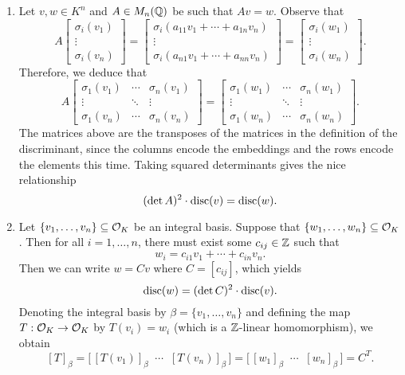 \begin{enumerate}[(1)]
    \item Let $v, w \in K^n$ and $A \in M_n(\mathbb{Q})$ be such that $Av = w$. 
    Observe that 
    \[ A \begin{bmatrix} \sigma_i(v_1) \\ \vdots \\ \sigma_i(v_n) \end{bmatrix} 
    = \begin{bmatrix} \sigma_i(a_{11}v_1 + \cdots + a_{1n}v_n) \\ \vdots \\ 
        \sigma_i(a_{n1}v_1 + \cdots + a_{nn}v_n) \end{bmatrix} 
    = \begin{bmatrix} \sigma_i(w_1) \\ \vdots \\ \sigma_i(w_n) \end{bmatrix}. \] 
    Therefore, we deduce that 
    \[ A \begin{bmatrix} \sigma_1(v_1) & \cdots & \sigma_n(v_1) \\ 
        \vdots & \ddots & \vdots \\ 
        \sigma_1(v_n) & \cdots & \sigma_n(v_n) \end{bmatrix} 
    = \begin{bmatrix} \sigma_1(w_1) & \cdots & \sigma_n(w_1) \\ 
        \vdots & \ddots & \vdots \\ 
        \sigma_1(w_n) & \cdots & \sigma_n(w_n) \end{bmatrix}. \] 
    The matrices above are the transposes of the matrices in the 
    definition of the discriminant, since the columns encode the embeddings 
    and the rows encode the elements this time. Taking squared determinants 
    gives the nice relationship
    \[ (\det A)^2 \cdot \operatorname{disc}(v) = \operatorname{disc}(w). \] 

    \item Let $\{v_1, \dots, v_n\} \subseteq {\cal O}_K$ be an integral basis.
    Suppose that $\{w_1, \dots, w_n\} \subseteq {\cal O}_K$. Then 
    for all $i = 1, \dots, n$, there must exist some $c_{ij} \in \mathbb{Z}$ such that 
    \[ w_i = c_{i1} v_1 + \cdots + c_{in} v_n. \] 
    Then we can write $w = Cv$ where $C = [c_{ij}]$, which yields 
    \[ \operatorname{disc}(w) = (\det C)^2 \cdot \operatorname{disc}(v). \] 
    Denoting the integral basis by $\beta = \{v_1, \dots, v_n\}$ and defining 
    the map $T : {\cal O}_K \to {\cal O}_K$ by $T(v_i) = w_i$ (which is a 
    $\mathbb{Z}$-linear homomorphism), we obtain 
    \[ [T]_\beta 
        = \Big[\,[T(v_1)]_\beta \;\; \cdots \;\;[T(v_n)]_\beta\,\Big]
        = \Big[\,[w_1]_\beta \;\; \cdots \;\; [w_n]_\beta\,\Big]
        = C^T. \] 
\end{enumerate}